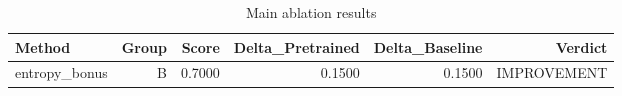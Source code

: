 \begin{table}[htbp]
\centering
\caption{Main ablation results}
\label{tab:main-results}
\begin{tabular}{lrrrrr}
\toprule
\textbf{Method} & \textbf{Group} & \textbf{Score} & \textbf{Delta\_Pretrained} & \textbf{Delta\_Baseline} & \textbf{Verdict} \\
\midrule
entropy\_bonus & B & 0.7000 & 0.1500 & 0.1500 & IMPROVEMENT \\
\bottomrule
\end{tabular}
\end{table}